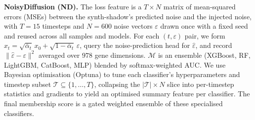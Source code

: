 \documentclass[11pt]{article}
\newcommand{\sikha}[1]{\textcolor{blue}{Sikha: #1}}
\begin{document}
%
\vspace{0.3em}
\noindent
\textbf{NoisyDiffusion (ND).} The loss feature is a $T \times N$ matrix of mean-squared errors (MSEs) between the synth-shadow's predicted noise and the injected noise, with $T = 15$ timesteps and $N = 600$ noise vectors $\varepsilon$ drawn once with a fixed seed and reused across all samples and models. For each $(t, \varepsilon)$ pair, we form $x_t = \sqrt{\bar\alpha_t}\, x_0 + \sqrt{1-\bar\alpha_t}\, \varepsilon$, query the noise-prediction head for $\hat\varepsilon$, and record $\|\hat\varepsilon - \varepsilon\|^2$ averaged over $978$ gene dimensions. $\mathcal{M}$ is an ensemble (XGBoost, RF, LightGBM, CatBoost, MLP) blended by softmax-weighted AUC. We use Bayesian optimisation (Optuna) to tune each classifier's hyperparameters and timestep subset $\mathcal{T} \subseteq \{1,\ldots,T\}$, collapsing the $|\mathcal{T}| \times N$ slice into per-timestep statistics and gradients to yield an optimised summary feature per classifier. The final membership score is a gated weighted ensemble of these specialised classifiers.
%
%
%
%
\end{document}
